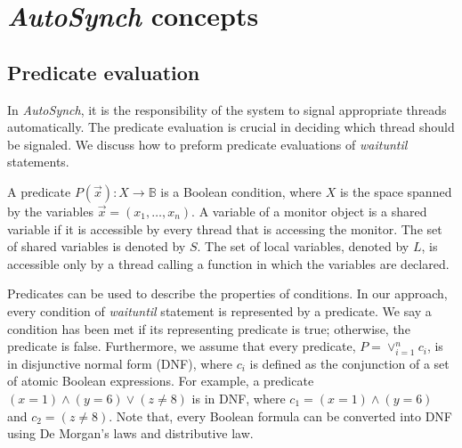 \documentclass{sigplanconf}
\begin{document}
\section{{\em AutoSynch} concepts} \label{sec:concept}


\subsection{Predicate evaluation} \label{sec:closure}
In {\em AutoSynch}, it is the responsibility of the system to signal appropriate 
threads automatically. The predicate evaluation is crucial in deciding which
thread should be signaled. We discuss how to preform predicate evaluations
of {\em waituntil} statements. 

A predicate $P(\vec{x}): X \rightarrow \mathbb{B}$ is a Boolean condition, 
where $X$ is the space spanned by the variables $\vec{x}=(x_1, \dots, x_n)$. 
A variable of a monitor object is a shared variable if it is accessible by every 
thread that is accessing the monitor. The set of shared variables is denoted by 
$S$. The set of local variables, denoted by $L$, is 
accessible only by a thread calling a function in which the variables are declared. 

Predicates can be used to describe the properties of conditions. In our
approach,
every condition of {\em waituntil} statement is represented by a predicate. We say
a condition has been met if its representing predicate is true; otherwise, the
predicate is false. 
Furthermore, we assume that every predicate, $P = \vee_{i=1}^nc_i$, is in 
disjunctive normal form (DNF), where $c_i$ is defined as the conjunction of a 
set of atomic Boolean expressions. For example, a predicate $(x = 1) \wedge 
(y = 6) \vee (z \ne 8)$ is in DNF, where $c_1 = (x = 1) \wedge (y = 6)$ and $c_2 = 
(z \ne 8)$. Note that, every Boolean formula can be converted into DNF using 
De Morgan's laws and distributive law. 
\end{document}
